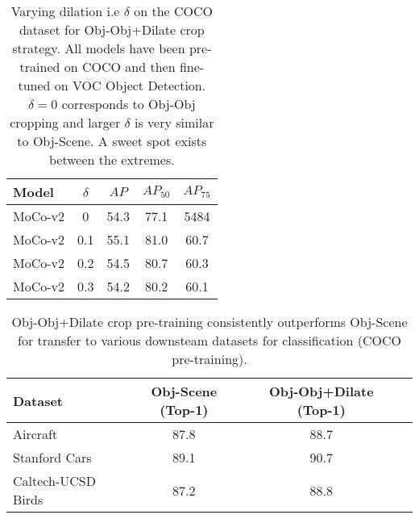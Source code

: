 \begin{table*}
    \centering
    \begin{tabu} to \linewidth {lcccc} 
        \toprule
        Model & $\delta$  & $AP$ & $AP_{50}$ & $AP_{75}$ \\
         
     \midrule
    
    MoCo-v2 & 0 & 54.3 & 77.1 & 5484\\
    MoCo-v2  & 0.1 & 55.1 & 81.0 & 60.7\\
    MoCo-v2 & 0.2 & 54.5 & 80.7 & 60.3\\
    MoCo-v2 & 0.3 & 54.2 & 80.2 & 60.1\\
    
        \bottomrule
    \end{tabu}
    \caption{Varying dilation i.e $\delta$ on the COCO dataset for Obj-Obj+Dilate crop strategy. All models have been pre-trained on COCO and then fine-tuned on VOC Object Detection. $\delta=0$ corresponds to Obj-Obj cropping and larger $\delta$ is very similar to Obj-Scene. A sweet spot exists between the extremes.}
    \label{tab:dilation_vary_coco}
    
\end{table*}



\begin{table}
    \centering
    \begin{tabu} to \linewidth {lccc} 
        \toprule
        Dataset & Obj-Scene (Top-1)  & Obj-Obj+Dilate (Top-1) \\
        
    
         \midrule
       Aircraft	& 87.8 &	88.7 \\
      Stanford Cars	& 89.1 &	90.7   \\
      Caltech-UCSD Birds	& 87.2 &88.8\\
        \bottomrule
    \end{tabu}
    \vspace{0.1in}
    \caption{Obj-Obj+Dilate crop pre-training consistently outperforms Obj-Scene for transfer to various downsteam datasets for classification (COCO pre-training).}
    \label{tab:object-object-analysis}
\end{table}




